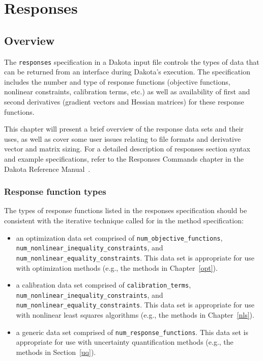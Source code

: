 \chapter{Responses}\label{responses}

\section{Overview}\label{responses:overview}

The \texttt{responses} specification in a Dakota input file controls
the types of data that can be returned from an interface during
Dakota's execution. The specification includes the number and type of
response functions (objective functions, nonlinear constraints, calibration 
terms, etc.) as well as availability of first and second
derivatives (gradient vectors and Hessian matrices) for these response
functions.

This chapter will present a brief overview of the response data sets
and their uses, as well as cover some user issues relating to file
formats and derivative vector and matrix sizing. For a detailed
description of responses section syntax and example specifications,
refer to the Responses Commands chapter in the Dakota Reference
Manual~\cite{RefMan}.

\subsection{Response function types}\label{responses:overview:types}

The types of response functions listed in the responses
specification should be consistent with the
iterative technique called for in the method specification:

\begin{itemize}

\item an optimization data set comprised of
  \texttt{num\_objective\_functions},\\
  \texttt{num\_nonlinear\_inequality\_constraints}, and
  \texttt{num\_nonlinear\_equality\_constraints}.  This data set is
  appropriate for use with optimization methods (e.g., the methods in
  Chapter~\ref{opt}).
  
\item a calibration data set comprised of 
  \texttt{calibration\_terms},\\
  \texttt{num\_nonlinear\_inequality\_constraints}, and
  \texttt{num\_nonlinear\_equality\_constraints}.  This data set is
  appropriate for use with nonlinear least squares algorithms
  (e.g., the methods in Chapter~\ref{nls}).
  
\item a generic data set comprised of \texttt{num\_response\_functions}.  
  This data set is appropriate for use with uncertainty quantification
  methods (e.g., the methods in Section~\ref{uq}).
  
\end{itemize}

